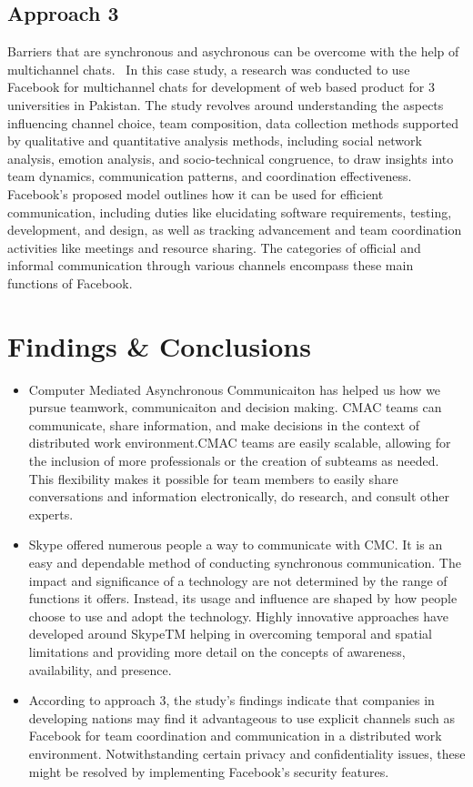 \documentclass{llncs}
\begin{document}
\subsection{Approach 3}
Barriers that are synchronous and asychronous can be overcome with the help of multichannel chats.~\cite{refbook1} In this case study, a research was conducted to use Facebook for multichannel chats for development of web based product for 3 universities in Pakistan. The study revolves around understanding the aspects  influencing channel choice, team composition, data collection methods supported by qualitative and quantitative analysis methods, including social network analysis, emotion analysis, and socio-technical congruence, to draw insights into team dynamics, communication patterns, and coordination effectiveness. Facebook's proposed model outlines how it can be used for efficient communication, including duties like elucidating software requirements, testing, development, and design, as well as tracking advancement and team coordination activities like meetings and resource sharing. The categories of official and informal communication through various channels encompass these main functions of Facebook. ~\cite{refpaper9}

\section{Findings \& Conclusions}

\begin{itemize}
    \item Computer Mediated Asynchronous Communicaiton has helped us how we pursue teamwork, communicaiton and decision making. CMAC teams can communicate, share information, and make decisions in the context of distributed work environment.CMAC teams are easily scalable, allowing for the inclusion of more professionals or the creation of subteams as needed. This flexibility makes it possible for team members to easily share conversations and information electronically, do research, and consult other experts. ~\cite{refpaper6}\\
    \item Skype offered numerous people a way to communicate with CMC. It is an easy and dependable method of conducting synchronous communication. The impact and significance of a technology are not determined by the range of functions it offers. Instead, its usage and influence are shaped by how people choose to use and adopt the technology. Highly innovative approaches have developed around SkypeTM  helping in overcoming  temporal and spatial limitations and providing more detail on the concepts of awareness, availability, and presence.~\cite{refpaper8}\\
    \item According to approach 3, the study's findings indicate that companies in developing nations may find it advantageous to use explicit channels such as Facebook for team coordination and communication in a distributed work environment. Notwithstanding certain privacy and confidentiality issues, these might be resolved by implementing Facebook's security features. ~\cite{refpaper9}

\end{itemize}
\end{document}
